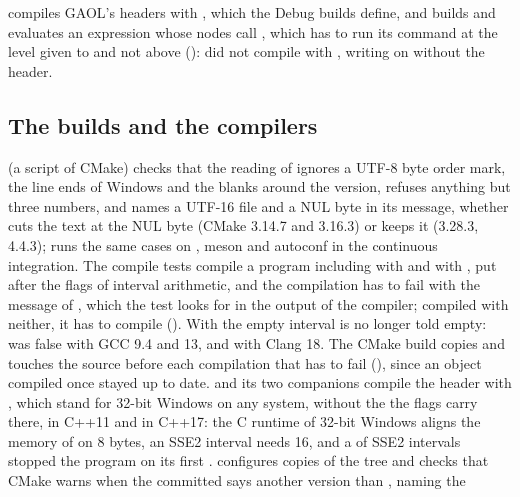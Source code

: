 \documentclass[12pt,a4paper,twoside,openright]{book}
\begin{document}
\medskip
{} compiles GAOL's headers with , which
the Debug builds define, and builds and evaluates an expression whose nodes
call , which has to run its command at the level
given to  and not above ():
 did not compile with
, writing on  without the
header.\newinvfive

\subsection{The builds and the compilers}

 (a script of CMake) checks that the reading of
 ignores a UTF-8 byte order mark, the line ends of
Windows and the blanks around the version, refuses anything but three
numbers, and names a UTF-16 file and a NUL byte in its message, whether
 cuts the text at the NUL byte (CMake 3.14.7 and 3.16.3)
or keeps it (3.28.3, 4.4.3);  runs the
same cases on , meson and autoconf in the continuous
integration.\newinvfive{} The compile tests  compile a
program including  with  and
with , put after the flags of interval arithmetic, and
the compilation has to fail with the message of ,
which the test looks for in the output of the compiler; compiled with
neither, it has to compile (). With
 the empty interval is no longer told empty:
 was false with GCC 9.4 and 13, and
with Clang 18. The CMake build copies and touches the source before each
compilation that has to fail (), since an
object compiled once stayed up to date.  and its
two companions compile the header with , which
stand for 32-bit Windows on any system, without the 
the flags carry there, in C++11 and in C++17: the C runtime of 32-bit
Windows aligns the memory of  on 8 bytes, an SSE2 interval needs
16, and a  of SSE2 intervals stopped the program on its
first .\newinvfive{}  configures
copies of the tree and checks that CMake warns when the committed
 says another version than , naming the
\end{document}
